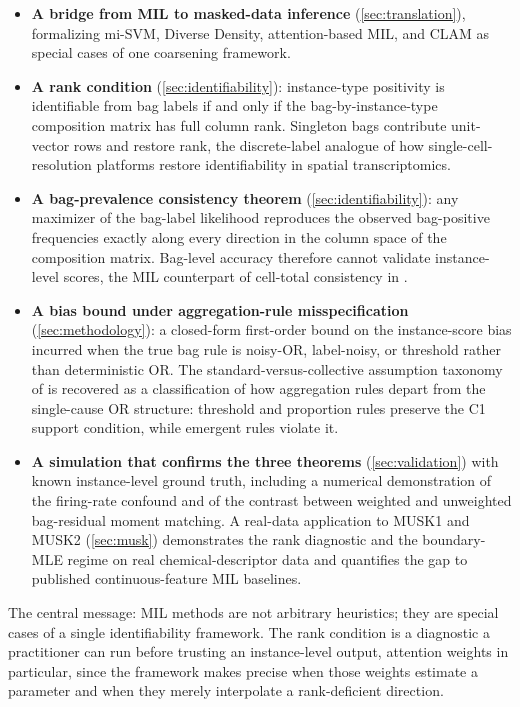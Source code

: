 \begin{itemize}
\item \textbf{A bridge from MIL to masked-data inference}
  (\cref{sec:translation}), formalizing mi-SVM, Diverse Density,
  attention-based MIL, and CLAM as special cases of one
  coarsening framework.

\item \textbf{A rank condition} (\cref{sec:identifiability}):
  instance-type positivity is identifiable from bag labels if and
  only if the bag-by-instance-type composition matrix has full
  column rank. Singleton bags contribute unit-vector rows and
  restore rank, the discrete-label analogue of how
  single-cell-resolution platforms restore identifiability in
  spatial transcriptomics.

\item \textbf{A bag-prevalence consistency theorem}
  (\cref{sec:identifiability}): any maximizer of the bag-label
  likelihood reproduces the observed bag-positive frequencies
  exactly along every direction in the column space of the
  composition matrix. Bag-level accuracy therefore cannot validate
  instance-level scores, the MIL counterpart of cell-total
  consistency in \citet{towell2026scrnacoarsening}.

\item \textbf{A bias bound under aggregation-rule misspecification}
  (\cref{sec:methodology}): a closed-form first-order bound on the
  instance-score bias incurred when the true bag rule is noisy-OR,
  label-noisy, or threshold rather than deterministic OR. The
  standard-versus-collective assumption taxonomy of
  \citet{foulds2010review} is recovered as a classification of how
  aggregation rules depart from the single-cause OR structure:
  threshold and proportion rules preserve the C1 support condition,
  while emergent rules violate it.

\item \textbf{A simulation that confirms the three theorems}
  (\cref{sec:validation}) with known instance-level ground truth,
  including a numerical demonstration of the firing-rate confound
  and of the contrast between weighted and unweighted bag-residual
  moment matching. A real-data application to MUSK1 and MUSK2
  (\cref{sec:musk}) demonstrates the rank diagnostic and the
  boundary-MLE regime on real chemical-descriptor data and quantifies
  the gap to published continuous-feature MIL baselines.
\end{itemize}

The central message: MIL methods are not arbitrary heuristics; they
are special cases of a single identifiability framework. The rank
condition is a diagnostic a practitioner can run before trusting an
instance-level output, attention weights in particular, since the
framework makes precise when those weights estimate a parameter and
when they merely interpolate a rank-deficient direction.
